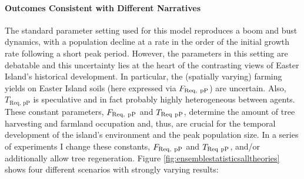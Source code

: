 \paragraph{Outcomes Consistent with Different Narratives}
The standard parameter setting used for this model reproduces a boom and bust dynamics, with a population decline at a rate in the order of the initial growth rate following a short peak period.
However, the parameters in this setting are debatable and this uncertainty lies at the heart of the contrasting views of Easter Island's historical development.
In particular, the (spatially varying) farming yields on Easter Island soils (here expressed via $F_{\rm Req, \ pP}$) are uncertain.
Also, $T_\text{Req, pP}$ is speculative and in fact probably highly heterogeneous between agents.
These constant parameters, $F_{\rm Req, \ pP}$ and $T_{\rm Req\ pP}$, determine the amount of tree harvesting and farmland occupation and, thus, are crucial for the temporal development of the island's environment and the peak population size. 
In a series of experiments I change these constants, $F_{\rm Req, \ pP}$ and $T_{\rm Req\ pP}$, and/or additionally allow tree regeneration.
Figure \ref{fig:ensemblestatisticsalltheories} shows four different scenarios with strongly varying results:
